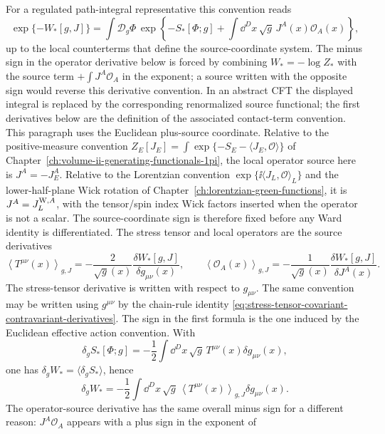 For a regulated path-integral representative this convention reads
\[
  \exp\{-W_\ast[g,J]\}
  =
  \int \mathcal D_g\Phi\,
  \exp\left\{
    -S_\ast[\Phi;g]
    +\int\dd^D x\,\sqrt g\,J^A(x)\mathcal O_A(x)
  \right\},
\]
up to the local counterterms that define the source-coordinate system.  The minus sign in
the operator derivative below is forced by combining \(W_\ast=-\log Z_\ast\)
with the source term \(+\int J^A\mathcal O_A\) in the exponent; a source written
with the opposite sign would reverse this derivative convention.  In an abstract
CFT the displayed integral is replaced by the corresponding renormalized source
functional; the first derivatives below are the definition of the associated
contact-term convention.  This paragraph uses the Euclidean plus-source
coordinate.  Relative to the positive-measure convention
\(Z_E[J_E]=\int\exp\{-S_E-\langle J_E,\mathcal O\rangle\}\) of
Chapter~\ref{ch:volume-ii-generating-functionals-1pi}, the local operator
source here is \(J^A=-J_E^A\).  Relative to the Lorentzian convention
\(\exp\{\ii\langle J_L,\mathcal O\rangle_L\}\) and the lower-half-plane Wick
rotation of Chapter~\ref{ch:lorentzian-green-functions}, it is
\(J^A=J_L^{{\rm W},A}\), with the tensor/spin index Wick factors inserted when
the operator is not a scalar.  The source-coordinate sign is therefore fixed
before any Ward identity is differentiated.
The stress tensor and local operators are the source derivatives
\begin{equation}
  \left\langle T^{\mu\nu}(x)\right\rangle_{g,J}
  =
  -\frac{2}{\sqrt g(x)}
  \frac{\delta W_\ast[g,J]}{\delta g_{\mu\nu}(x)},
  \qquad
  \left\langle \mathcal O_A(x)\right\rangle_{g,J}
  =
  -\frac{1}{\sqrt g(x)}
  \frac{\delta W_\ast[g,J]}{\delta J^A(x)} .
  \label{eq:cft-source-derivative-conventions}
\end{equation}
The stress-tensor derivative is written with respect to \(g_{\mu\nu}\).  The
same convention may be written using \(g^{\mu\nu}\) by the chain-rule identity
\eqref{eq:stress-tensor-covariant-contravariant-derivatives}.
The sign in the first formula is the one induced by the Euclidean effective
action convention.  With
\[
  \delta_g S_\ast[\Phi;g]
  =
  -\frac12
  \int\dd^D x\,\sqrt g\,
  T^{\mu\nu}(x)\delta g_{\mu\nu}(x),
\]
one has \(\delta_g W_\ast=\langle\delta_g S_\ast\rangle\), hence
\[
  \delta_g W_\ast
  =
  -\frac12
  \int\dd^D x\,\sqrt g\,
  \left\langle T^{\mu\nu}(x)\right\rangle_{g,J}\delta g_{\mu\nu}(x).
\]
The operator-source derivative has the same overall minus sign for a different
reason: \(J^A\mathcal O_A\) appears with a plus sign in the exponent of
